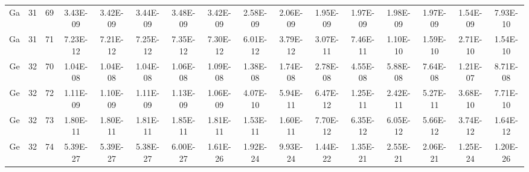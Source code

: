{\begin{tabular}{|c|c|c|c|c|c|c|c|c|c|c|c|c|c|c|c|}
Ga & 31 & 69  & 3.43E-09 & 3.42E-09 & 3.44E-09 & 3.48E-09 & 3.42E-09 & 2.58E-09 & 2.06E-09 & 1.95E-09 & 1.97E-09 & 1.98E-09 & 1.97E-09 & 1.54E-09 & 7.93E-10 \\
Ga & 31 & 71  & 7.23E-12 & 7.21E-12 & 7.25E-12 & 7.35E-12 & 7.30E-12 & 6.01E-12 & 3.79E-12 & 3.07E-11 & 7.46E-11 & 1.10E-10 & 1.59E-10 & 2.71E-10 & 1.54E-10 \\
Ge & 32 & 70  & 1.04E-08 & 1.04E-08 & 1.04E-08 & 1.06E-08 & 1.09E-08 & 1.38E-08 & 1.74E-08 & 2.78E-08 & 4.55E-08 & 5.88E-08 & 7.64E-08 & 1.21E-07 & 8.71E-08 \\
Ge & 32 & 72  & 1.11E-09 & 1.10E-09 & 1.11E-09 & 1.13E-09 & 1.06E-09 & 4.07E-10 & 5.94E-11 & 6.47E-12 & 1.25E-11 & 2.42E-11 & 5.27E-11 & 3.68E-10 & 7.71E-10 \\
Ge & 32 & 73  & 1.80E-11 & 1.80E-11 & 1.81E-11 & 1.85E-11 & 1.81E-11 & 1.53E-11 & 1.60E-11 & 7.70E-12 & 6.35E-12 & 6.05E-12 & 5.66E-12 & 3.74E-12 & 1.64E-12 \\
Ge & 32 & 74  & 5.39E-27 & 5.39E-27 & 5.38E-27 & 6.00E-27 & 1.61E-26 & 1.92E-24 & 9.93E-24 & 1.44E-22 & 1.35E-21 & 2.55E-21 & 2.06E-21 & 1.25E-24 & 1.20E-26 \\




\hline

\end{tabular}}
